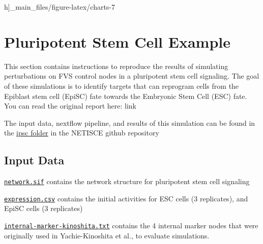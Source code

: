 \documentclass[
]{book}
\begin{document}
h]{_main_files/figure-latex/charts-7}

\hypertarget{pluripotent-stem-cell-example}{%
\chapter{Pluripotent Stem Cell Example}\label{pluripotent-stem-cell-example}}

This section contains instructions to reproduce the results of simulating perturbations on FVS control nodes in a pluripotent stem cell signaling. The goal of these simulations is to identify targets that can reprogram cells from the Epiblast stem cell (EpiSC) fate towards the Embryonic Stem Cell (ESC) fate. You can read the original report here: link

The input data, nextflow pipeline, and results of this simulation can be found in the \href{https://github.com/VeraLiconaResearchGroup/Netisce/tree/main/ipsc_validation}{ipsc folder} in the NETISCE github repository

\hypertarget{input-data-1}{%
\section{Input Data}\label{input-data-1}}

\href{https://github.com/VeraLiconaResearchGroup/Netisce/blob/main/ipsc_validation/input_data/network.sif}{\texttt{network.sif}} contains the network structure for pluripotent stem cell signaling

\href{https://github.com/VeraLiconaResearchGroup/Netisce/blob/main/ipsc_validation/input_data/expression.csv}{\texttt{expression.csv}} contains the initial activities for ESC cells (3 replicates), and EpiSC cells (3 replicates)

\href{https://github.com/VeraLiconaResearchGroup/Netisce/blob/main/ipsc_validation/input_data/internal-marker-kinoshita.txt}{\texttt{internal-marker-kinoshita.txt}} contains the 4 internal marker nodes that were originally used in Yachie-Kinoshita et al., to evaluate simulations.
\end{document}
